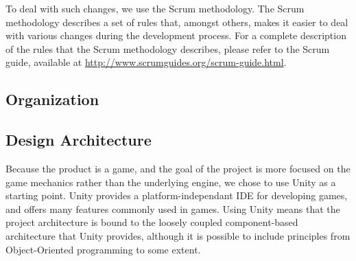       To deal with such changes, we use the Scrum methodology. The Scrum
      methodology describes a set of rules that, amongst others, makes it
      easier to deal with various changes during the development process.
      For a complete description of the rules that the Scrum methodology
      describes, please refer to the Scrum guide, available at
      \url{http://www.scrumguides.org/scrum-guide.html}.

    \subsection{Organization} \label{ssec:organization}

    \subsection{Design Architecture} \label{ssec:designarchitecture}
      Because the product is a game, and the goal of the project is more
      focused on the game mechanics rather than the underlying engine, we chose
      to use Unity as a starting point. Unity provides a platform-independant
      IDE for developing games, and offers many features commonly used in
      games. Using Unity means that the project architecture is bound to the
      loosely coupled component-based architecture that Unity provides,
      although it is possible to include principles from Object-Oriented
      programming to some extent.
